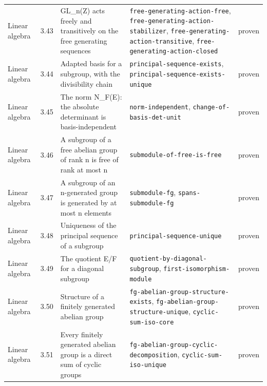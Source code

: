 \begin{longtable}{@{}ll>{\raggedright\arraybackslash}p{4.2cm}>{\raggedright\arraybackslash}p{4.2cm}l@{}}
Linear algebra & 3.43 & GL\_n(Z) acts freely and transitively on the free generating sequences & \texttt{free-\allowbreak{}generating-\allowbreak{}action-\allowbreak{}free}, \texttt{free-\allowbreak{}generating-\allowbreak{}action-\allowbreak{}stabilizer}, \texttt{free-\allowbreak{}generating-\allowbreak{}action-\allowbreak{}transitive}, \texttt{free-\allowbreak{}generating-\allowbreak{}action-\allowbreak{}closed} & proven \\
Linear algebra & 3.44 & Adapted basis for a subgroup, with the divisibility chain & \texttt{principal-\allowbreak{}sequence-\allowbreak{}exists}, \texttt{principal-\allowbreak{}sequence-\allowbreak{}exists-\allowbreak{}unique} & proven \\
Linear algebra & 3.45 & The norm N\_F(E): the absolute determinant is basis-independent & \texttt{norm-\allowbreak{}independent}, \texttt{change-\allowbreak{}of-\allowbreak{}basis-\allowbreak{}det-\allowbreak{}unit} & proven \\
Linear algebra & 3.46 & A subgroup of a free abelian group of rank n is free of rank at most n & \texttt{submodule-\allowbreak{}of-\allowbreak{}free-\allowbreak{}is-\allowbreak{}free} & proven \\
Linear algebra & 3.47 & A subgroup of an n-generated group is generated by at most n elements & \texttt{submodule-\allowbreak{}fg}, \texttt{spans-\allowbreak{}submodule-\allowbreak{}fg} & proven \\
Linear algebra & 3.48 & Uniqueness of the principal sequence of a subgroup & \texttt{principal-\allowbreak{}sequence-\allowbreak{}unique} & proven \\
Linear algebra & 3.49 & The quotient E/F for a diagonal subgroup & \texttt{quotient-\allowbreak{}by-\allowbreak{}diagonal-\allowbreak{}subgroup}, \texttt{first-\allowbreak{}isomorphism-\allowbreak{}module} & proven \\
Linear algebra & 3.50 & Structure of a finitely generated abelian group & \texttt{fg-\allowbreak{}abelian-\allowbreak{}group-\allowbreak{}structure-\allowbreak{}exists}, \texttt{fg-\allowbreak{}abelian-\allowbreak{}group-\allowbreak{}structure-\allowbreak{}unique}, \texttt{cyclic-\allowbreak{}sum-\allowbreak{}iso-\allowbreak{}core} & proven \\
Linear algebra & 3.51 & Every finitely generated abelian group is a direct sum of cyclic groups & \texttt{fg-\allowbreak{}abelian-\allowbreak{}group-\allowbreak{}cyclic-\allowbreak{}decomposition}, \texttt{cyclic-\allowbreak{}sum-\allowbreak{}iso-\allowbreak{}unique} & proven \\

\end{longtable}
